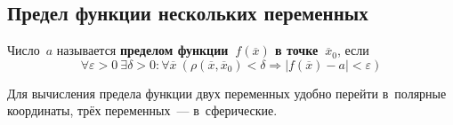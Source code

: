 \subsection{Предел функции нескольких переменных}
Число~$a$ называется \textbf{пределом функции~$f(\overline x)$ в точке~$\overline x_0$}, если
\begin{equation*}
\forall \varepsilon > 0 \ \exists \delta > 0 \colon \forall \overline x \ (\rho(\overline x, \overline x_0) < \delta \Rightarrow |f(\overline x) - a| < \varepsilon)
\end{equation*}

Для вычисления предела функции двух переменных удобно перейти в~полярные координаты, трёх переменных~--- в~сферические.